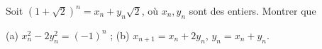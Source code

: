 Soit $(1 + \sqrt{2})^n = x_n + y_n\sqrt{2}$, où $x_n, y_n$ sont des entiers. Montrer que

(a) $x_n^2 - 2y_n^2 = (-1)^n$ ; (b) $x_{n+1} = x_n + 2y_n$, $y_n = x_n + y_n$.

